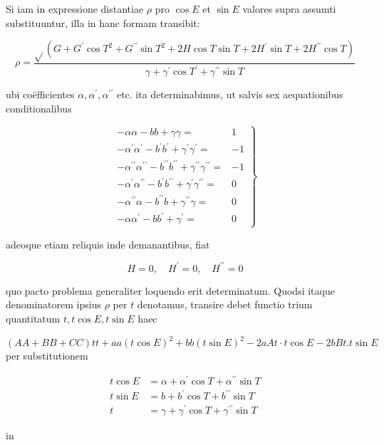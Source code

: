 \documentclass[10pt]{article}
\begin{document}
Si iam in expressione distantiae \(\rho\) pro \(\cos E\) et \(\sin E\) valores supra assumti substituuntur, illa in hanc formam transibit:

\[
\rho=\frac{\sqrt{ }\left(G+G^{\prime} \cos T^{2}+G^{\prime \prime} \sin T^{2}+2 H \cos T \sin T+2 H^{\prime} \sin T+2 H^{\prime \prime} \cos T\right)}{\gamma+\gamma^{\prime} \cos T^{\prime}+\gamma^{\prime \prime} \sin T}
\]

ubi coëfficientes \(\alpha, \alpha^{\prime}, \alpha^{\prime \prime}\) etc. ita determinabimus, ut salvis sex aequationibus conditionalibus

\[
\left.\begin{array}{lr}
-\alpha \alpha-b b+\gamma \gamma= & 1 \\
-\alpha^{\prime} \alpha^{\prime}-b^{\prime} b^{\prime}+\gamma^{\prime} \gamma^{\prime}= & -1 \\
-\alpha^{\prime \prime} \alpha^{\prime \prime}-b^{\prime \prime} b^{\prime \prime}+\gamma^{\prime \prime} \gamma^{\prime \prime}= & -1 \\
-\alpha^{\prime} \alpha^{\prime \prime}-b^{\prime} b^{\prime \prime}+\gamma^{\prime} \gamma^{\prime \prime}= & 0 \\
-\alpha^{\prime \prime} \alpha-b^{\prime \prime} b+\gamma^{\prime \prime} \gamma= & 0 \\
-\alpha \alpha^{\prime}-b b^{\prime}+\gamma^{\prime}= & 0
\end{array}\right\}
\]

adeoque etiam reliquis inde demanantibus, fiat

\[
H=0, \quad H^{\prime}=0, \quad H^{\prime \prime}=0
\]

quo pacto problema generaliter loquendo erit determinatum. Quodsi itaque denominatorem ipsius \(\rho\) per \(t\) denotamus, transire debet functio trium quantitatum \(t, t \cos E, t \sin E\) haec

\((A A+B B+C C) t t+a a(t \cos E)^{2}+b b(t \sin E)^{2}-2 a A t \cdot t \cos E-2 b B t . t \sin E\) per substitutionem

\[
\begin{aligned}
t \cos E & =\alpha+\alpha^{\prime} \cos T+\alpha^{\prime \prime} \sin T \\
t \sin E & =b+b^{\prime} \cos T+b^{\prime \prime} \sin T \\
t & =\gamma+\gamma^{\prime} \cos T+\gamma^{\prime \prime} \sin T
\end{aligned}
\]

in
\end{document}
